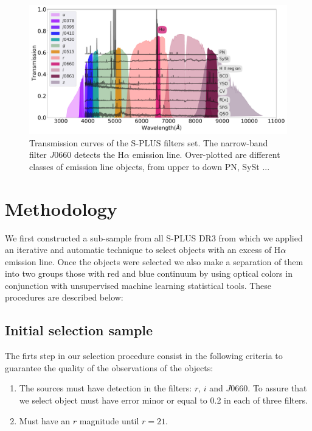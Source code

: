 \documentclass[fleqn,usenatbib]{mnras}
\begin{document}
\begin{figure}
    \includegraphics[width=0.9\linewidth]{Figs/splus-filter.pdf}
    \caption{Transmission curves of the S-PLUS filters set. The narrow-band filter
      $J0660$ detects the H$\alpha$ emission line. Over-plotted are different
      classes of emission line objects, from upper to down PN, SySt ... }
    \label{fig:curves}
\end{figure}


\section{Methodology}
\label{sec:metho}

We first constructed a sub-sample from all S-PLUS DR3 from which we
applied an iterative and automatic technique to select objects with
an excess of H{$\alpha$} emission line. Once the objects were selected
we also make a separation of them into two groups those with red and blue
continuum by using optical colors in conjunction with unsupervised
 machine learning statistical tools. These procedures are described below:

\subsection{Initial selection sample}
\label{sec:}

The firts step in our selection procedure consist in the following
criteria to guarantee the quality of the observations of the objects:

\begin{enumerate}
\item The sources must have detection in the filters: $r$, $i$ and
  $J$0660. To assure that we select object must have error minor or
  equal to 0.2 in each of three filters.

\item Must have an $r$ magnitude until $r = 21$.
  
\end{enumerate}
\end{document}
